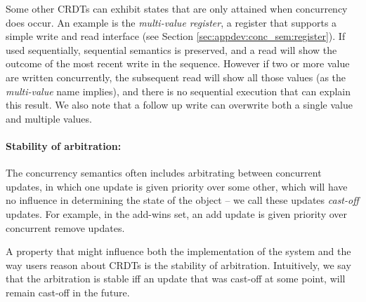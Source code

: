 \documentclass[11pt,a4paper]{article}
\begin{document}

Some other CRDTs can exhibit states that are only attained when concurrency 
does occur. An example is the \emph{multi-value register}, 
a register that supports
a simple write and read interface (see Section \ref{sec:appdev:conc_sem:register}). 
If used sequentially, sequential semantics is preserved, and a read will show the 
outcome of the most recent write in the sequence. 
However if two or more value are written concurrently, the subsequent read will show 
all those values (as the \emph{multi-value} name implies), and there is no sequential 
execution that can explain this result. 
We also note that a follow up write can overwrite both a single value and multiple values. 

\paragraph{Stability of arbitration:}
The concurrency semantics often includes arbitrating between concurrent 
updates, in which one update is given priority over some other, which 
will have no influence in determining the state of the object -- we call these
updates \emph{cast-off} updates. 
For example, in the add-wins set, an add update is given priority over concurrent 
remove updates.

A property that might influence both the implementation of the system and the 
way users reason about CRDTs is the stability of arbitration. 
Intuitively, we say that the arbitration is stable iff an update that was cast-off 
at some point, will remain cast-off in the future.
\end{document}
